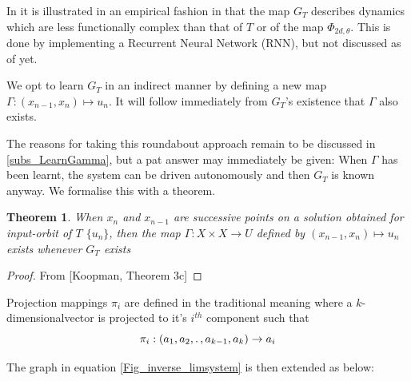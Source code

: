 \documentclass[a4paper,12pt,twoside]{book}
\newtheorem{Definition}{Definition}[]
\newtheorem{Theorem}{Theorem}[]
\begin{document}
In \cite{manjunath2021universal} it is illustrated in an empirical fashion in that the map $G_T$ describes dynamics which are less functionally complex than that of $T$ or of the map $\Phi_{2d,\theta}$. This is done by implementing a Recurrent Neural Network (RNN), but not discussed as of yet. 
 
We opt to learn $G_T$ in an indirect manner by defining a new map $\Gamma:(x_{n-1},x_n)\mapsto{u_n}$. It will follow immediately from $G_T$’s existence that $\Gamma$ also exists. 

The reasons for taking this roundabout approach remain to be discussed in \ref{subs_LearnGamma}, but a pat answer may immediately be given: When $\Gamma$ has been learnt, the system can be driven autonomously and then $G_T$ is known anyway. We formalise this with a theorem.

\begin{Theorem}
  When $x_n$ and $x_{n-1}$ are successive points on a solution obtained for input-orbit of $T$ $\{u_n\}$, then the map $\Gamma: X\times{X}\to{U}$ defined by $(x_{n-1},x_n)\mapsto{u_n}$ exists whenever $G_T$ exists 
\end{Theorem}
\begin{proof}
  From [Koopman, Theorem 3c] 
\end{proof}

Projection mappings $\pi_i$ are defined in the traditional meaning where a $k$-dimensionalvector is projected to it's $i^{th}$ component such that $$\pi_i:(a_1,a_2, \ldotp, a_{k-1}, a_k)\to{a_i}$$


The graph in equation \ref{Fig_inverse_limsystem} is then extended as below:
\end{document}
